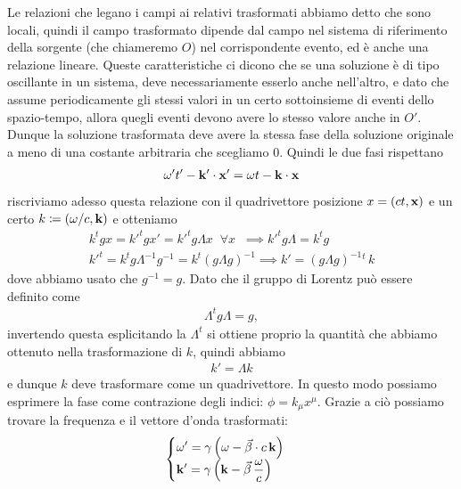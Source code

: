 Le relazioni che legano i campi ai relativi trasformati abbiamo detto che sono locali, quindi il campo trasformato dipende dal campo nel sistema di 
riferimento della sorgente (che chiameremo $ O $) nel corrispondente evento, ed è anche una relazione lineare. Queste caratteristiche ci dicono che 
se una soluzione è di tipo oscillante in un sistema, deve necessariamente esserlo anche nell'altro, e dato che assume periodicamente gli stessi 
valori in un certo sottoinsieme di eventi dello spazio-tempo, allora quegli eventi devono avere lo stesso valore anche in $ O' $. Dunque la soluzione 
trasformata deve avere la stessa fase della soluzione originale a meno di una costante arbitraria che scegliamo $ 0 $. Quindi le due fasi rispettano
\begin{align}
  \omega' t' - \mathbf{k'} \cdot \mathbf{x'} = \omega t - \mathbf{k} \cdot \mathbf{x}
\end{align}
riscriviamo adesso questa relazione con il quadrivettore posizione $ x = (c t, \mathbf{x}) $ e un certo $ k \coloneq (\omega/c, \mathbf{k}) $ e otteniamo
\begin{gather}
  k^t g x = k'^t g x'= k'^t g \Lambda x \;\; \forall x \;\; \implies k'^tg \Lambda = k^t g 
  \\
  k'^t = k^t g \Lambda^{-1} g^{-1} = k^t \left( g \Lambda g\right)^{-1} \implies k' = \left( g \Lambda g\right)^{-1}{}^t\, k
\end{gather}
dove abbiamo usato che $ g^{-1} = g $. Dato che il gruppo di Lorentz può essere definito come
\begin{align}
  \Lambda^t g \Lambda = g ,
\end{align}
invertendo questa esplicitando la $ \Lambda^t $ si ottiene proprio la quantità che abbiamo ottenuto nella trasformazione di $ k $, 
quindi abbiamo 
\begin{align}
  k' = \Lambda k
\end{align}
e dunque $ k $ deve trasformare come un quadrivettore. In questo modo possiamo esprimere la fase come contrazione degli indici: 
$ \phi = k_\mu x^\mu $. Grazie a ciò possiamo trovare la frequenza e il vettore d'onda trasformati:
\begin{align}
  \begin{cases}
    \displaystyle \omega' = \gamma\left( \omega - \vec{\beta} \cdot c\, \mathbf{k} \right)
    \\
    \displaystyle \mathbf{k}' = \gamma \left( \mathbf{k} - \vec{\beta} \, \frac{\omega}{c} \right)
  \end{cases}
\end{align}
